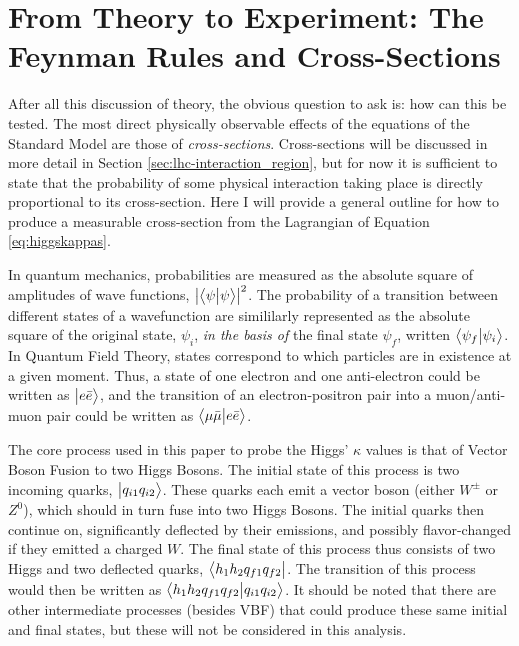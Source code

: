 \section{From Theory to Experiment: The Feynman Rules and Cross-Sections}
    
    After all this discussion of theory, the obvious question to ask is: how can this be tested.
    The most direct physically observable effects of the equations of the Standard Model are those of \textit{cross-sections}.
    Cross-sections will be discussed in more detail in Section \ref{sec:lhc-interaction_region},
        but for now it is sufficient to state that the probability of some physical interaction taking place is directly proportional to its cross-section.
    Here I will provide a general outline for how to produce a measurable cross-section from the Lagrangian of Equation \ref{eq:higgskappas}.

    In quantum mechanics, probabilities are measured as the absolute square of amplitudes of wave functions, $\left|\big< \psi \big| \psi \big>\right|^2$.
    The probability of a transition between different states of a wavefunction are simililarly represented
        as the absolute square of the original state, $\psi_i$, \textit{in the basis of} the final state $\psi_f$,
        written $ \big< \psi_f \big| \psi_i \big>$.
    In Quantum Field Theory, states correspond to which particles are in existence at a given moment.
    Thus, a state of one electron and one anti-electron could be written as $\big| e \bar{e} \big>$,
        and the transition of an electron-positron pair into a muon/anti-muon pair could be written
        as $\big< \mu \bar{\mu} \big| e \bar{e} \big>$.

    The core process used in this paper to probe the Higgs' $\kappa$ values is that of Vector Boson Fusion to two Higgs Bosons.
    The initial state of this process is two incoming quarks, $\big| q_{i1} q_{i2} \big>$.
    These quarks each emit a vector boson (either $W^{\pm}$ or $Z^0$), 
    which should in turn fuse into two Higgs Bosons.
    The initial quarks then continue on, significantly deflected by their emissions, and possibly flavor-changed if they emitted a charged $W$.
    The final state of this process thus consists of two Higgs and two deflected quarks, $\big< h_1 h_2 q_{f1} q_{f2} \big|$.
    The transition of this process would then be written as $\big<  h_1 h_2 q_{f1} q_{f2} \big| q_{i1} q_{i2} \big>$.
    It should be noted that there are other intermediate processes (besides VBF)
        that could produce these same initial and final states, but these will not be considered in this analysis.

